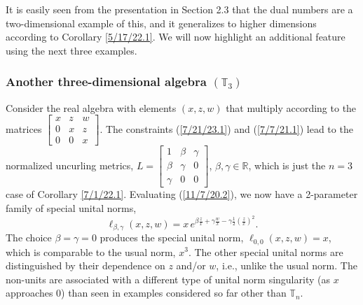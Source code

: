\documentclass{amsart}
\numberwithin{equation}{section}
\theoremstyle{definition}
\numberwithin{theorem}{section}
\begin{document}
It is easily seen from the presentation in Section 2.3 that the dual numbers are a two-dimensional example of this, and it
generalizes to higher dimensions according to Corollary \ref{5/17/22.1}.  We will now highlight an additional feature using the next three examples.  

\subsubsection{Another three-dimensional algebra $(\mathbb{T}_3)$}Consider the real algebra with elements  $(x,z,w)$ that multiply according to the matrices $ \left[
\begin{array}{ccc}
x & z & w   \\
0 & x & z \\
0 & 0 & x  
\end{array}
\right]$.    The constraints (\ref{7/21/23.1}) and (\ref{7/7/21.1}) lead to the normalized uncurling metrics, $ L = \left[
\begin{array}{ccc}
1 & \beta & \gamma   \\
\beta & \gamma & 0 \\
\gamma & 0 & 0  
\end{array}
\right]$, $\beta,\gamma\in\mathbb{R}$, which is just the $n=3$ case of Corollary \ref{7/1/22.1}.    Evaluating (\ref{11/7/20.2}), we now have a 2-parameter family of special unital norms, \begin{equation}\label{3/31/21.3} \ell_{\beta,\gamma}(x,z,w) = x\, e^{ \beta\frac{z}{x}  +\gamma \frac{w}{x} -\gamma \frac{ 1}{2}\left(\frac{z}{x}\right)^2 }.\end{equation}    The choice $\beta = \gamma = 0$ produces the special unital norm, $\ell_{0,0}(x,z,w)= x$, which is comparable to the usual norm, $x^3$. 
 The other special unital norms are distinguished by their dependence on $z$ and/or $w$, i.e., unlike the usual norm.  The non-units are associated with a different type of unital norm singularity (as $x$ approaches 0) than seen in examples considered so far other than $\mathbb{T}_n$.
 
\end{document}

